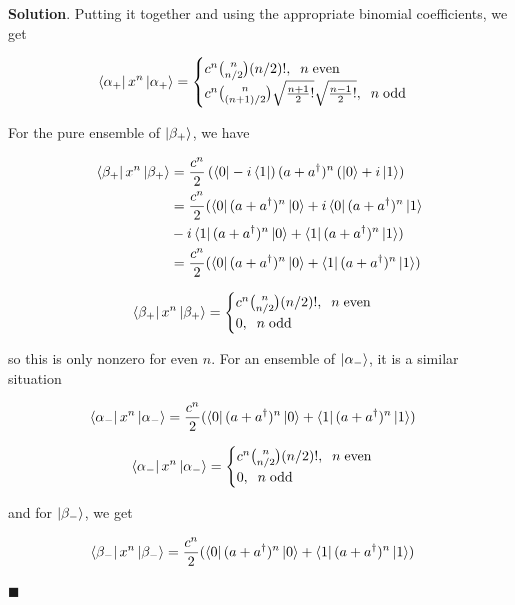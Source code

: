 \documentclass[12pt]{article}
\theoremstyle{definition}
\newenvironment{s}{%
        \begin{trivlist} \item \textbf{Solution}. }{%
            \hspace*{\fill} $\blacksquare$\end{trivlist}}%
\begin{document}
{\begin{s}
Putting it together and using the appropriate binomial coefficients, we get

$$
\bra{\alpha_+}x^{n}\ket{\alpha_+}=
\begin{cases}
c^{n}{n\choose n/2}(n/2)!, \;\;n \;\mathrm{even} \\
c^{n}{n\choose (n+1)/2}\sqrt{\frac{n+1}{2}!}\sqrt{\frac{n-1}{2}!}, \;\;n \;\mathrm{odd} \\
\end{cases}
$$

For the pure ensemble of $\ket{\beta_{+}}$, we have

\begin{align*}
\bra{\beta_+}x^{n}\ket{\beta_+} &= \frac{c^{n}}{2}\left(\bra{0} - i\bra{1}\right)(a+a^{\dagger})^{n}\left(\ket{0} + i\ket{1}\right)\\
&= \frac{c^{n}}{2}(\bra{0}(a+a^{\dagger})^{n}\ket{0} + i\bra{0}(a+a^{\dagger})^{n}\ket{1}\\
&- i\bra{1}(a+a^{\dagger})^{n}\ket{0} + \bra{1}(a+a^{\dagger})^{n}\ket{1})\\
&= \frac{c^{n}}{2}(\bra{0}(a+a^{\dagger})^{n}\ket{0} + \bra{1}(a+a^{\dagger})^{n}\ket{1})
\end{align*}

$$
\bra{\beta_+}x^{n}\ket{\beta_+}=
\begin{cases}
c^{n}{n\choose n/2}(n/2)!, \;\;n \;\mathrm{even} \\
0, \;\;n \;\mathrm{odd} \\
\end{cases}
$$

so this is only nonzero for even $n$. For an ensemble of $\ket{\alpha_{-}}$, it is a similar situation 

\begin{align*}
\bra{\alpha_-}x^{n}\ket{\alpha_-} &= \frac{c^{n}}{2}(\bra{0}(a+a^{\dagger})^{n}\ket{0} + \bra{1}(a+a^{\dagger})^{n}\ket{1})
\end{align*}

$$
\bra{\alpha_-}x^{n}\ket{\alpha_-}=
\begin{cases}
c^{n}{n\choose n/2}(n/2)!, \;\;n \;\mathrm{even} \\
0, \;\;n \;\mathrm{odd} \\
\end{cases}
$$

and for $\ket{\beta_{-}}$, we get

\begin{align*}
\bra{\beta_-}x^{n}\ket{\beta_-} &= \frac{c^{n}}{2}(\bra{0}(a+a^{\dagger})^{n}\ket{0} + \bra{1}(a+a^{\dagger})^{n}\ket{1})
\end{align*}


\end{s}}
\end{document}
